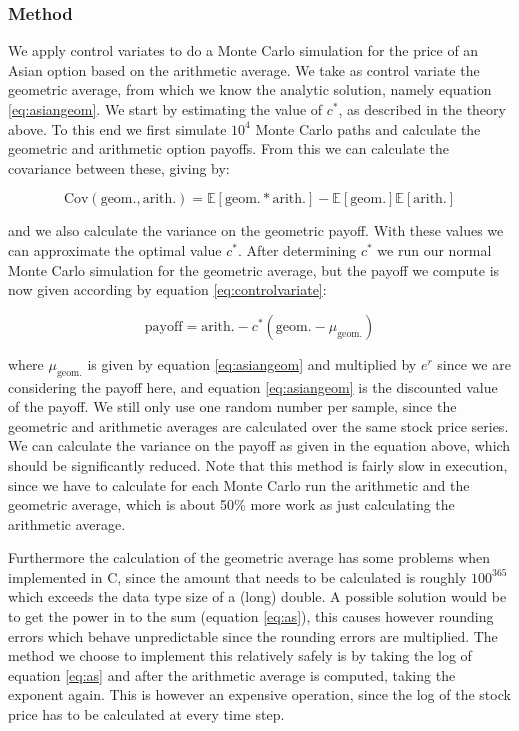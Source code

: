 \documentclass[11pt,a4paper]{article}
\begin{document}
\subsubsection{Method}
We apply control variates to do a Monte Carlo simulation for the price of an Asian option based on the arithmetic average. We take as control variate the geometric average, from which we know the analytic solution, namely equation \ref{eq:asiangeom}. We start by estimating the value of $c^*$, as described in the theory above. To this end we first simulate $10^4$ Monte Carlo paths and calculate the geometric and arithmetic option payoffs. From this we can calculate the covariance between these, giving by:

\begin{equation}
  \text{Cov}(\text{geom.},\text{arith.}) = \mathbb{E}[\text{geom.}*\text{arith.}] - \mathbb{E}[\text{geom.}]\mathbb{E}[\text{arith.}]
\end{equation}

and we also calculate the variance on the geometric payoff. With these values we can approximate the optimal value $c^*$. After determining $c^*$ we run our normal Monte Carlo simulation for the geometric average, but the payoff we compute is now given according by equation \ref{eq:controlvariate}:

\begin{equation}
  \text{payoff} = \text{arith.} - c^*(\text{geom.} - \mu_{\text{geom.}})
\end{equation}

where $\mu_{\text{geom.}}$ is given by equation \ref{eq:asiangeom} and multiplied by $e^{r}$ since we are considering the payoff here, and equation \ref{eq:asiangeom} is the discounted value of the payoff. We still only use one random number per sample, since the geometric and arithmetic averages are calculated over the same stock price series. We can calculate the variance on the payoff as given in the equation above, which should be significantly reduced. Note that this method is fairly slow in execution, since we have to calculate for each Monte Carlo run the arithmetic and the geometric average, which is about 50\% more work as just calculating the arithmetic average.

Furthermore the calculation of the geometric average has some problems when implemented in C, since the amount that needs to be calculated is roughly $100^{365}$ which exceeds the data type size of a (long) double. A possible solution would be to get the power in to the sum (equation \ref{eq:as}), this causes however rounding errors which behave unpredictable since the rounding errors are multiplied. The method we choose to implement this relatively safely is by taking the log of equation \ref{eq:as} and after the arithmetic average is computed, taking the exponent again. This is however an expensive operation, since the log of the stock price has to be calculated at every time step.
\end{document}
